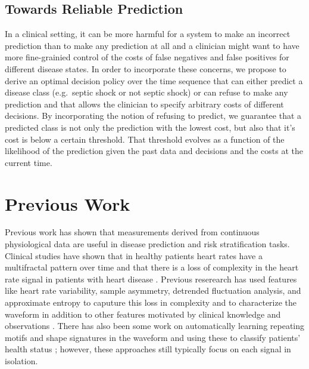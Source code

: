 \documentclass[dvips,12pt]{article}
\begin{document}
\subsection{Towards Reliable Prediction}
In a clinical setting, it can be more harmful for a system to make an incorrect prediction than to make any prediction at all and a clinician might want to have more fine-grainied control of the costs of false negatives and false positives for different disease states. In order to incorporate these concerns, we propose to derive an optimal decision policy over the time sequence that can either predict a disease class (e.g.\ septic shock or not septic shock) or can refuse to make any prediction and that allows the clinician to specify arbitrary costs of different decisions. By incorporating the notion of refusing to predict, we guarantee that a predicted class is not only the prediction with the lowest cost, but also that it's cost is below a certain threshold. That threshold evolves as a function of the likelihood of the prediction given the past data and decisions and the costs at the current time.

\section{Previous Work}
Previous work has shown that measurements derived from continuous physiological data are useful in disease prediction and risk stratification tasks. Clinical studies have shown that in healthy patients heart rates have a multifractal pattern over time and that there is a loss of complexity in the heart rate signal in patients with heart disease \cite{Ivanov1999mul}. Previous reserearch has used features like heart rate variability, sample asymmetry, detrended fluctuation analysis, and approximate entropy to caputure this loss in complexity and to characterize the waveform in addition to other features motivated by clinical knowledge and observations \cite{Moorman2011car, Clark2012bre, Moorman2011mor, Nemati2011twa}.  There has also been some work on automatically learning repeating motifs and shape signatures in  the waveform and using these to classify patients' health status \cite{Syed2010mot, Shavdia2007, SariaThesis2011} ; however, these approaches still typically focus on each signal in isolation.




\end{document}
